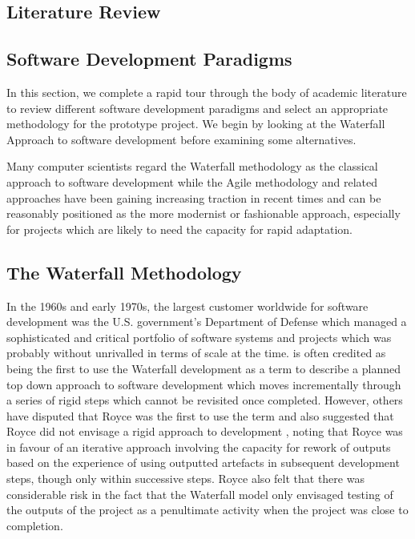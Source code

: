 \documentclass[a4paper,12pt]{article}
\begin{document}
\begin{samepage}
\section {Literature Review}
\subsection{Software Development Paradigms}

In this section, we complete a rapid tour through the body of academic literature to review different software development paradigms and select an appropriate methodology for the prototype project. We begin by looking at the Waterfall Approach to software development before examining some alternatives. 

Many computer scientists regard the Waterfall methodology as the classical approach to software development while the Agile methodology and related approaches have been gaining increasing traction in recent times and can be reasonably positioned as the more modernist or fashionable approach, especially for projects which are likely to need the capacity for rapid adaptation.

\subsection {The Waterfall Methodology}

In the 1960s and early 1970s, the largest customer worldwide for software development was the U.S. government's Department of Defense which managed a sophisticated and critical portfolio of software systems and projects which was probably without unrivalled in terms of scale at the time.  \parencite{royce} is often credited as being the first to use the Waterfall development as a term to describe a planned top down approach to software development which moves incrementally through a series of rigid steps which cannot be revisited once completed. However, others have disputed that Royce was the first to use the term and  also suggested that Royce did not envisage a rigid approach to development , noting that Royce was in favour of an iterative approach involving the capacity for rework of outputs based on the experience of using outputted artefacts in subsequent development steps, though only within successive steps. Royce also felt that there was considerable risk in the fact that the Waterfall model only envisaged testing of the outputs of the project as a penultimate activity when the project was close to completion.


\end{samepage}
\end{document}
